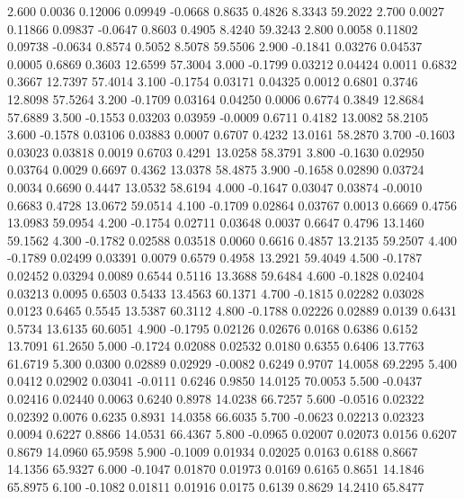    2.600   0.0036   0.12006   0.09949  -0.0668   0.8635   0.4826   8.3343  59.2022
   2.700   0.0027   0.11866   0.09837  -0.0647   0.8603   0.4905   8.4240  59.3243
   2.800   0.0058   0.11802   0.09738  -0.0634   0.8574   0.5052   8.5078  59.5506
   2.900  -0.1841   0.03276   0.04537   0.0005   0.6869   0.3603  12.6599  57.3004
   3.000  -0.1799   0.03212   0.04424   0.0011   0.6832   0.3667  12.7397  57.4014
   3.100  -0.1754   0.03171   0.04325   0.0012   0.6801   0.3746  12.8098  57.5264
   3.200  -0.1709   0.03164   0.04250   0.0006   0.6774   0.3849  12.8684  57.6889
   3.500  -0.1553   0.03203   0.03959  -0.0009   0.6711   0.4182  13.0082  58.2105
   3.600  -0.1578   0.03106   0.03883   0.0007   0.6707   0.4232  13.0161  58.2870
   3.700  -0.1603   0.03023   0.03818   0.0019   0.6703   0.4291  13.0258  58.3791
   3.800  -0.1630   0.02950   0.03764   0.0029   0.6697   0.4362  13.0378  58.4875
   3.900  -0.1658   0.02890   0.03724   0.0034   0.6690   0.4447  13.0532  58.6194
   4.000  -0.1647   0.03047   0.03874  -0.0010   0.6683   0.4728  13.0672  59.0514
   4.100  -0.1709   0.02864   0.03767   0.0013   0.6669   0.4756  13.0983  59.0954
   4.200  -0.1754   0.02711   0.03648   0.0037   0.6647   0.4796  13.1460  59.1562
   4.300  -0.1782   0.02588   0.03518   0.0060   0.6616   0.4857  13.2135  59.2507
   4.400  -0.1789   0.02499   0.03391   0.0079   0.6579   0.4958  13.2921  59.4049
   4.500  -0.1787   0.02452   0.03294   0.0089   0.6544   0.5116  13.3688  59.6484
   4.600  -0.1828   0.02404   0.03213   0.0095   0.6503   0.5433  13.4563  60.1371
   4.700  -0.1815   0.02282   0.03028   0.0123   0.6465   0.5545  13.5387  60.3112
   4.800  -0.1788   0.02226   0.02889   0.0139   0.6431   0.5734  13.6135  60.6051
   4.900  -0.1795   0.02126   0.02676   0.0168   0.6386   0.6152  13.7091  61.2650
   5.000  -0.1724   0.02088   0.02532   0.0180   0.6355   0.6406  13.7763  61.6719
   5.300   0.0300   0.02889   0.02929  -0.0082   0.6249   0.9707  14.0058  69.2295
   5.400   0.0412   0.02902   0.03041  -0.0111   0.6246   0.9850  14.0125  70.0053
   5.500  -0.0437   0.02416   0.02440   0.0063   0.6240   0.8978  14.0238  66.7257
   5.600  -0.0516   0.02322   0.02392   0.0076   0.6235   0.8931  14.0358  66.6035
   5.700  -0.0623   0.02213   0.02323   0.0094   0.6227   0.8866  14.0531  66.4367
   5.800  -0.0965   0.02007   0.02073   0.0156   0.6207   0.8679  14.0960  65.9598
   5.900  -0.1009   0.01934   0.02025   0.0163   0.6188   0.8667  14.1356  65.9327
   6.000  -0.1047   0.01870   0.01973   0.0169   0.6165   0.8651  14.1846  65.8975
   6.100  -0.1082   0.01811   0.01916   0.0175   0.6139   0.8629  14.2410  65.8477
